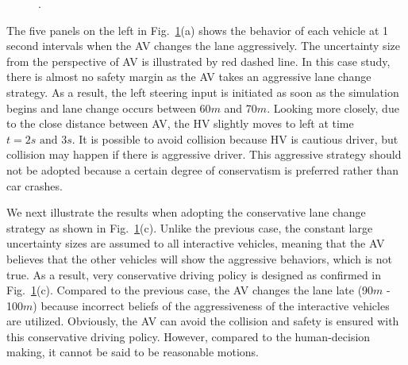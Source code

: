 \documentclass[10pt,journal]{IEEEtran}
\begin{document}
\begin{figure}
\begin{centering}
			\par\end{centering}
		\protect\caption{.}
		\label{fig:snapshots}
	\end{figure}
	
	The five panels on the left in Fig.~\ref{fig:snapshots}(a) shows the behavior of each vehicle at 1 second intervals when the AV changes the lane aggressively. The uncertainty size from the perspective of AV is illustrated by red dashed line. In this case study, there is almost no safety margin as the AV takes an aggressive lane change strategy. As a result, the left steering input is initiated as soon as the simulation begins and lane change occurs between 60$m$ and 70$m$. Looking more closely, due to the close distance between AV, the HV slightly moves to left at time $t=2s \text{ and } 3s$. It is possible to avoid collision because HV is cautious driver, but collision may happen if there is aggressive driver. This aggressive strategy should not be adopted because a certain degree of conservatism is preferred rather than car crashes.
	
	We next illustrate the results when adopting the conservative lane change strategy as shown in Fig.~\ref{fig:snapshots}(c). Unlike the previous case, the constant large uncertainty sizes are assumed to all interactive vehicles, meaning that the AV believes that the other vehicles will show the aggressive behaviors, which is not true. As a result, very conservative driving policy is designed as confirmed in Fig.~\ref{fig:snapshots}(c). Compared to the previous case, the AV changes the lane late (90$m$ - 100$m$) because incorrect beliefs of the aggressiveness of the interactive vehicles are utilized. Obviously, the AV can avoid the collision and safety is ensured with this conservative driving policy. However, compared to the human-decision making, it cannot be said to be reasonable motions.
	
\end{document}
